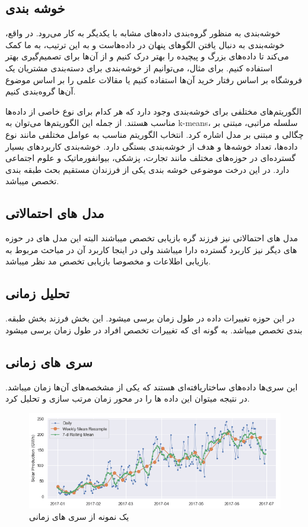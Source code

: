 \subsection*{خوشه بندی}
خوشه‌بندی به منظور گروه‌بندی داده‌های مشابه با یکدیگر به کار می‌رود. در واقع، خوشه‌بندی به دنبال یافتن الگوهای پنهان در داده‌هاست و به این ترتیب، به ما کمک می‌کند تا داده‌های بزرگ و پیچیده را بهتر درک کنیم و از آن‌ها برای تصمیم‌گیری بهتر استفاده کنیم. برای مثال، می‌توانیم از خوشه‌بندی برای دسته‌بندی مشتریان یک فروشگاه بر اساس رفتار خرید آن‌ها استفاده کنیم یا مقالات علمی را بر اساس موضوع آن‌ها گروه‌بندی کنیم.

الگوریتم‌های مختلفی برای خوشه‌بندی وجود دارد که هر کدام برای نوع خاصی از داده‌ها مناسب هستند. از جمله این الگوریتم‌ها می‌توان به k-means، سلسله مراتبی، مبتنی بر چگالی و مبتنی بر مدل اشاره کرد. انتخاب الگوریتم مناسب به عوامل مختلفی مانند نوع داده‌ها، تعداد خوشه‌ها و هدف از خوشه‌بندی بستگی دارد. خوشه‌بندی کاربردهای بسیار گسترده‌ای در حوزه‌های مختلف مانند تجارت، پزشکی، بیوانفورماتیک و علوم اجتماعی دارد.
در این درخت موضوعی خوشه بندی یکی از فرزندان مستقیم بحث طبقه بندی تخصص میباشد.

\subsection*{مدل های احتمالاتی}
 مدل های احتمالاتی نیز فرزند گره بازیابی تخصص میباشند البته این مدل های در حوزه های دیگر نیز کاربرد گسترده دارا میباشند ولی در اینجا کاربرد آن در مباحث مربوط به بازیابی اطلاعات و مخصوصا بازیابی تخصص مد نظر میباشد.


\subsection*{تحلیل زمانی}
.در این حوزه تغییرات داده در طول زمان برسی میشود. این بخش فرزند بخش طبقه بندی تخصص میباشد. به گونه ای که تغییرات تخصص افراد در طول زمان برسی میشود

\subsection*{سری های زمانی}
این سری‌ها داده‌های ساختاریافته‌ای هستند که یکی از مشخصه‌های آن‌ها زمان میباشد. در نتیجه میتوان این داده ها را در محور زمان مرتب سازی و تحلیل کرد.
\begin{figure}[tb]
	\centering
	\includegraphics[width=1\linewidth]{time-series-pandas_78_0.png}
	\caption {یک نمونه از سری های زمانی}
	\label{fig:logo}
\end{figure}

